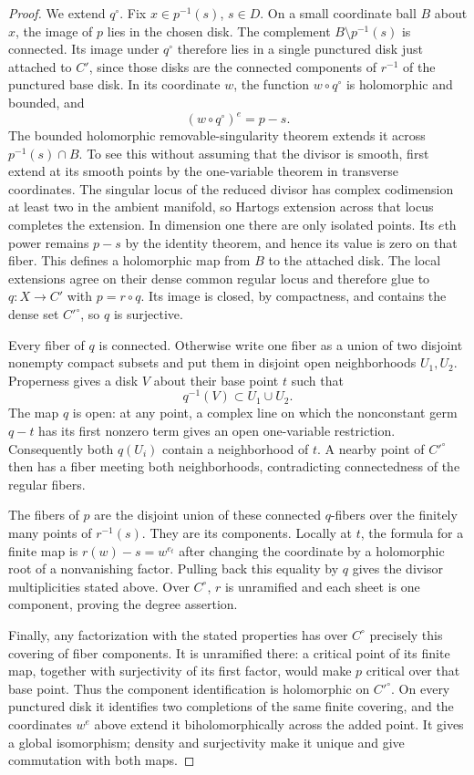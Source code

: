\begin{proof}
We extend $q^\circ$. Fix $x\in p^{-1}(s)$, $s\in D$. On a
small coordinate ball $B$ about $x$, the image of $p$ lies in
the chosen disk. The complement $B\setminus p^{-1}(s)$ is
connected. Its image under $q^\circ$ therefore lies in a single
punctured disk just attached to $C'$, since those disks are
the connected components of $r^{-1}$ of the punctured base
disk. In its coordinate $w$, the function $w\circ q^\circ$ is
holomorphic and bounded, and
\[
 (w\circ q^\circ)^e=p-s.
\]
The bounded holomorphic removable-singularity theorem extends
it across $p^{-1}(s)\cap B$. To see this without assuming that
the divisor is smooth, first extend at its smooth points by
the one-variable theorem in transverse coordinates. The
singular locus of the reduced divisor has complex codimension
at least two in the ambient manifold, so Hartogs extension
across that locus completes the extension. In dimension one
there are only isolated points. Its $e$th power remains $p-s$ by
the identity theorem, and hence its value is zero on that
fiber. This defines a holomorphic map from $B$ to the attached
disk. The local extensions agree on their dense common
regular locus and therefore glue to $q:X\to C'$ with
$p=r\circ q$. Its image is closed, by compactness, and contains
the dense set $C'^\circ$, so $q$ is surjective.

Every fiber of $q$ is connected. Otherwise write one fiber
as a union of two disjoint nonempty compact subsets and put
them in disjoint open neighborhoods $U_1,U_2$. Properness
gives a disk $V$ about their base point $t$ such that
\[
 q^{-1}(V)\subset U_1\cup U_2.
\]
The map $q$ is open: at any point, a complex line on which
the nonconstant germ $q-t$ has its first nonzero term gives
an open one-variable restriction. Consequently both
$q(U_i)$ contain a neighborhood of $t$. A nearby point of
$C'^\circ$ then has a fiber meeting both neighborhoods,
contradicting connectedness of the regular fibers.

The fibers of $p$ are the disjoint union of these connected
$q$-fibers over the finitely many points of $r^{-1}(s)$.
They are its components. Locally at $t$, the formula for a
finite map is $r(w)-s=w^{e_t}$ after changing the coordinate
by a holomorphic root of a nonvanishing factor. Pulling back
this equality by $q$ gives the divisor multiplicities stated
above. Over $C^\circ$, $r$ is unramified and each sheet is
one component, proving the degree assertion.

Finally, any factorization with the stated properties has
over $C^\circ$ precisely this covering of fiber components.
It is unramified there: a critical point of its finite map,
together with surjectivity of its first factor, would make
$p$ critical over that base point. Thus the component
identification is holomorphic on $C'^\circ$. On every
punctured disk it identifies two completions of the same
finite covering, and the coordinates $w^e$ above extend it
biholomorphically across the added point. It gives a global
isomorphism; density and surjectivity make it unique and
give commutation with both maps.
\end{proof}

